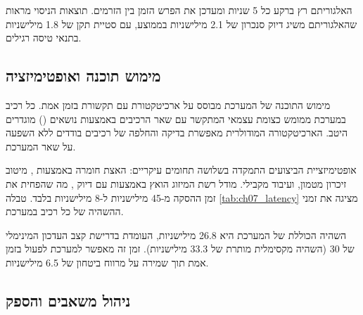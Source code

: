 האלגוריתם רץ ברקע כל 5 שניות ומעדכן את הפרש הזמן בין הזרמים. תוצאות הניסוי מראות שהאלגוריתם משיג דיוק סנכרון של 2.1 מילישניות בממוצע, עם סטיית תקן של 1.8 מילישניות בתנאי טיסה רגילים.

\subsection{מימוש תוכנה ואופטימיזציה}
\label{sec:ch07_software}

מימוש התוכנה של המערכת מבוסס על ארכיטקטורת  עם תקשורת  בזמן אמת. כל רכיב במערכת ממומש כצומת  עצמאי המתקשר עם שאר הרכיבים באמצעות נושאים () מוגדרים היטב. הארכיטקטורה המודולרית מאפשרת בדיקה והחלפה של רכיבים בודדים ללא השפעה על שאר המערכת.

אופטימיזציית הביצועים התמקדה בשלושה תחומים עיקריים: האצת חומרה באמצעות , מיטוב זיכרון מטמון, ועיבוד מקבילי. מודל רשת המיזוג הואץ באמצעות  עם דיוק , מה שהפחית את זמן ההסקה מ-45 מילישניות ל-8 מילישניות בלבד. טבלה \ref{tab:ch07_latency} מציגה את זמני ההשהיה של כל רכיב במערכת.

\begin{table}[htbp]
\centering
\caption{זמני השהיה ממוצעים של רכיבי המערכת.}
\label{tab:ch07_latency}
\end{table}

השהיה הכוללת של המערכת היא 26.8 מילישניות, העומדת בדרישת קצב העדכון המינימלי של 30  (השהיה מקסימלית מותרת של 33.3 מילישניות). זמן זה מאפשר למערכת לפעול בזמן אמת תוך שמירה על מרווח ביטחון של 6.5 מילישניות.

\subsection{ניהול משאבים והספק}
\label{sec:ch07_power}

